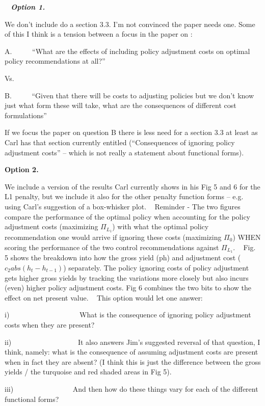 \documentclass[authoryear, review, 12pt]{elsarticle}
\newcommand{\pa}[1]{{\it \color{darkblue} #1}}
\begin{document}
\pa{
   
  \textbf{Option 1.}

  We don’t include do a section 3.3. I’m not convinced the paper needs one. Some of this I think is a tension between a focus in the paper on :

  A.      ``What are the effects of including policy adjustment costs on optimal policy recommendations at all?''

  Vs.

  B.      ``Given that there will be costs to adjusting policies but we don’t know just what form these will take, what are the consequences of different cost formulations''



  If we focus the paper on question B there is less need for a section 3.3 at least as Carl has that section currently entitled (``Consequences of ignoring policy adjustment costs'' – which is not really a statement about functional forms).
   

  \textbf{Option 2.}

  We include a version of the results Carl currently shows in his Fig 5 and 6 for the L1 penalty, but we include it also for the other penalty function forms – e.g. using Carl’s suggestion of a box-whisker plot.
   
  Reminder - The two figures compare the performance of the optimal policy when accounting for the policy adjustment costs (maximizing $\Pi_{L_1}$) with what the optimal policy recommendation one would arrive if ignoring these costs (maximizing $\Pi_0$) WHEN scoring the performance of the two control recommendations against $\Pi_{L_1}$.
   
  Fig. 5 shows the breakdown into how the gross yield (ph) and adjustment cost ($c_2 abs(h_t-h_{t-1})$) separately. The policy ignoring costs of policy adjustment gets higher gross yields by tracking the variations more closely but also incurs (even) higher policy adjustment costs. Fig 6 combines the two bits to show the effect on net present value.
   
  This option would let one answer:

  i)                    What is the consequence of ignoring policy adjustment costs when they are present?

  ii)                   It also answers Jim’s suggested reversal of that question, I think, namely: what is the consequence of assuming adjustment costs are present when in fact they are absent? (I think this is just the difference between the gross yields / the turquoise and red shaded areas in Fig 5).

  iii)                 And then how do these things vary for each of the different functional forms?

}
\end{document}
